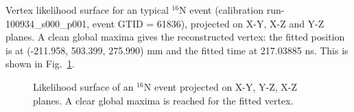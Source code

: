 Vertex likelihood surface for an typical {$^{16}$}N event (calibration run-100934\_s000\_p001, event GTID = 61836), projected on X-Y, X-Z and Y-Z planes. A clean global maxima gives the reconstructed vertex: the fitted position is at (-211.958, 503.399, 275.990) mm and the fitted time at 217.03885 ns. This is shown in Fig.~\ref{likelihoodSurface}. 

\begin{figure}
	\centering
	\caption{Likelihood surface of an {$^{16}$}N event projected on X-Y, Y-Z, X-Z planes. A clear global maxima is reached for the fitted vertex.}
	\label{likelihoodSurface}
\end{figure}


